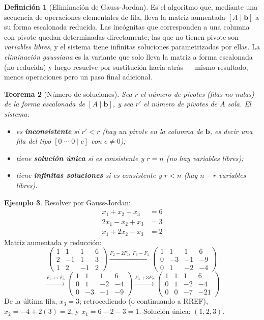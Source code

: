\documentclass[11pt,letterpaper]{article}
\theoremstyle{definition}
\newtheorem{definicion}{Definición}[section]
\newtheorem{ejemplo}[definicion]{Ejemplo}
\theoremstyle{plain}
\newtheorem{teorema}[definicion]{Teorema}
\newcommand{\vv}[1]{\mathbf{#1}}
\begin{document}
\begin{definicion}[Eliminación de Gauss-Jordan]
Es el algoritmo que, mediante una secuencia de operaciones elementales de fila, lleva la matriz
aumentada $[A\mid\vv{b}]$ a su forma escalonada reducida. Las incógnitas que corresponden a una
columna con pivote quedan determinadas directamente; las que no tienen pivote son
\emph{variables libres}, y el sistema tiene infinitas soluciones parametrizadas por ellas. La
\emph{eliminación gaussiana} es la variante que solo lleva la matriz a forma escalonada (no
reducida) y luego resuelve por sustitución hacia atrás --- mismo resultado, menos operaciones
pero un paso final adicional.
\end{definicion}

\begin{teorema}[Número de soluciones]
Sea $r$ el número de pivotes (filas no nulas) de la forma escalonada de $[A\mid\vv{b}]$, y sea
$r'$ el número de pivotes de $A$ sola. El sistema:
\begin{itemize}
  \item es \textbf{inconsistente} si $r' < r$ (hay un pivote en la columna de $\vv{b}$, es decir
        una fila del tipo $[0\;\cdots\;0\mid c]$ con $c\neq 0$);
  \item tiene \textbf{solución única} si es consistente y $r=n$ (no hay variables libres);
  \item tiene \textbf{infinitas soluciones} si es consistente y $r<n$ (hay $n-r$ variables
        libres).
\end{itemize}
\end{teorema}

\begin{ejemplo}
Resolver por Gauss-Jordan:
\[
\begin{aligned}
  x_1 + x_2 + x_3 &= 6 \\
  2x_1 - x_2 + x_3 &= 3 \\
  x_1 + 2x_2 - x_3 &= 2
\end{aligned}
\]
Matriz aumentada y reducción:
\[
  \left(\begin{array}{ccc|c} 1&1&1&6\\ 2&-1&1&3\\ 1&2&-1&2 \end{array}\right)
  \xrightarrow{F_2-2F_1,\; F_3-F_1}
  \left(\begin{array}{ccc|c} 1&1&1&6\\ 0&-3&-1&-9\\ 0&1&-2&-4 \end{array}\right)
\]
\[
  \xrightarrow{F_2\leftrightarrow F_3}
  \left(\begin{array}{ccc|c} 1&1&1&6\\ 0&1&-2&-4\\ 0&-3&-1&-9 \end{array}\right)
  \xrightarrow{F_3+3F_2}
  \left(\begin{array}{ccc|c} 1&1&1&6\\ 0&1&-2&-4\\ 0&0&-7&-21 \end{array}\right)
\]
De la última fila, $x_3=3$; retrocediendo (o continuando a RREF), $x_2=-4+2(3)=2$, y
$x_1=6-2-3=1$. Solución única: $(1,2,3)$.
\end{ejemplo}
\end{document}
